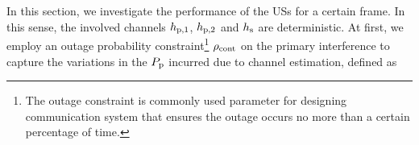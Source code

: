 In this section, we investigate the performance of the USs for a certain frame. In this sense, the involved channels $h_{\text{p,1}}$, $h_{\text{p,2}}$ and $h_{\text{s}}$ are deterministic.   
At first, we employ an outage probability constraint\footnote{The outage constraint is commonly used parameter for designing communication system that ensures the outage occurs no more than a certain percentage of time.} $\rho_{\text{cont}}$ on the primary interference to capture the variations in the $P_{\text{p}}$ incurred due to channel estimation, defined as 
